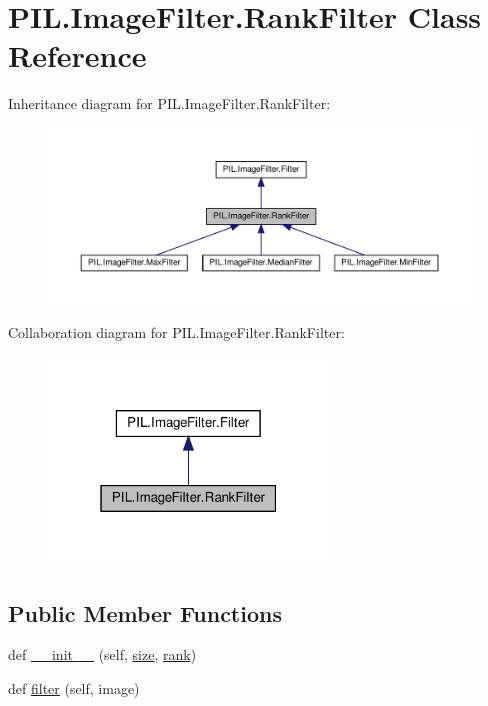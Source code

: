 \hypertarget{classPIL_1_1ImageFilter_1_1RankFilter}{}\section{P\+I\+L.\+Image\+Filter.\+Rank\+Filter Class Reference}
\label{classPIL_1_1ImageFilter_1_1RankFilter}


Inheritance diagram for P\+I\+L.\+Image\+Filter.\+Rank\+Filter\+:
\nopagebreak
\begin{figure}[H]
\begin{center}
\leavevmode
\includegraphics[width=350pt]{classPIL_1_1ImageFilter_1_1RankFilter__inherit__graph}
\end{center}
\end{figure}


Collaboration diagram for P\+I\+L.\+Image\+Filter.\+Rank\+Filter\+:
\nopagebreak
\begin{figure}[H]
\begin{center}
\leavevmode
\includegraphics[width=211pt]{classPIL_1_1ImageFilter_1_1RankFilter__coll__graph}
\end{center}
\end{figure}
\subsection*{Public Member Functions}
\begin{DoxyCompactItemize}
\item 
def \hyperlink{classPIL_1_1ImageFilter_1_1RankFilter_a9d9e5c89c4735f3f5d258c4e0de51dd3}{\+\_\+\+\_\+init\+\_\+\+\_\+} (self, \hyperlink{classPIL_1_1ImageFilter_1_1RankFilter_a0bc57f5d65445f9500239870e164a89c}{size}, \hyperlink{classPIL_1_1ImageFilter_1_1RankFilter_a0c93d894de8bbf6255925952dd0e5b4e}{rank})
\item 
def \hyperlink{classPIL_1_1ImageFilter_1_1RankFilter_a67b8ca1a19de4ccbfadbfe655e8be848}{filter} (self, image)
\end{DoxyCompactItemize}
